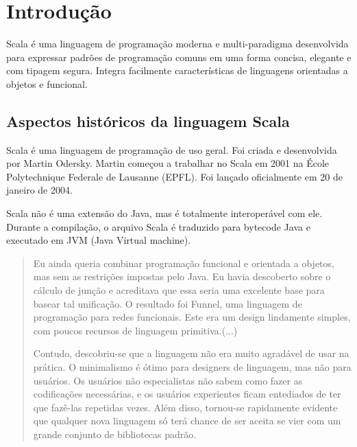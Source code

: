 

\chapter{ Introdu\c{c}\~{a}o}

Scala é uma linguagem de programação moderna e multi-paradigma desenvolvida para expressar padrões de programação comuns em uma forma concisa, elegante e com tipagem segura. Integra facilmente características de linguagens orientadas a objetos e funcional.

   \section{Aspectos hist\'{o}ricos da linguagem Scala}



Scala é uma linguagem de programação de uso geral. Foi criada e desenvolvida por Martin Odersky. Martin começou a trabalhar no Scala em 2001 na École Polytechnique Federale de Lausanne (EPFL). Foi lançado oficialmente em 20 de janeiro de 2004.

Scala não é uma extensão do Java, mas é totalmente interoperável com ele. Durante a compilação, o arquivo Scala é traduzido para bytecode Java e executado em JVM (Java Virtual machine).


\begin{quote}
Eu ainda queria combinar programação funcional e orientada a objetos, mas sem as restrições impostas pelo Java. Eu havia descoberto sobre o cálculo de junção e acreditava que essa seria uma excelente base para basear tal unificação. O resultado foi Funnel, uma linguagem de programação para redes funcionais. Este era um design lindamente simples, com poucos recursos de linguagem primitiva.(...)

Contudo, descobriu-se que a linguagem não era muito agradável de usar na prática. O minimalismo é ótimo para designers de linguagem, mas não para usuários. Os usuários não especialistas não sabem como fazer as codificações necessárias, e os usuários experientes ficam entediados de ter que fazê-las repetidas vezes. Além disso, tornou-se rapidamente evidente que qualquer nova linguagem só terá chance de ser aceita se vier com um grande conjunto de bibliotecas padrão.

\end{quote}


